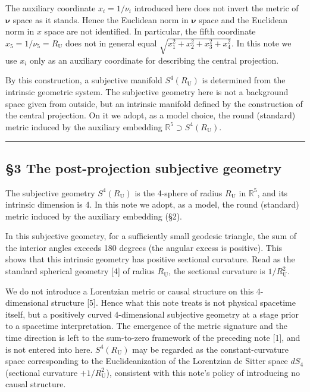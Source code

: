 \documentclass[
]{article}
\begin{document}
The auxiliary coordinate \(x_i=1/\nu_i\) introduced here does not invert
the metric of \(\boldsymbol{\nu}\) space as it stands. Hence the
Euclidean norm in \(\boldsymbol{\nu}\) space and the Euclidean norm in
\(x\) space are not identified. In particular, the fifth coordinate
\(x_5=1/\nu_5=R_{\mathrm U}\) does not in general equal
\(\sqrt{x_1^2+x_2^2+x_3^2+x_4^2}\). In this note we use \(x_i\) only as
an auxiliary coordinate for describing the central projection.

By this construction, a subjective manifold \(S^4(R_{\mathrm U})\) is
determined from the intrinsic geometric system. The subjective geometry
here is not a background space given from outside, but an intrinsic
manifold defined by the construction of the central projection. On it we
adopt, as a model choice, the round (standard) metric induced by the
auxiliary embedding \(\mathbb{R}^5\supset S^4(R_{\mathrm U})\).

\begin{center}\rule{0.5\linewidth}{0.5pt}\end{center}

\subsection{§3 The post-projection subjective
geometry}\label{the-post-projection-subjective-geometry}

The subjective geometry \(S^4(R_{\mathrm U})\) is the 4-sphere of radius
\(R_{\mathrm U}\) in \(\mathbb{R}^5\), and its intrinsic dimension is 4.
In this note we adopt, as a model, the round (standard) metric induced
by the auxiliary embedding (§2).

In this subjective geometry, for a sufficiently small geodesic triangle,
the sum of the interior angles exceeds 180 degrees (the angular excess
is positive). This shows that this intrinsic geometry has positive
sectional curvature. Read as the standard spherical geometry {[}4{]} of
radius \(R_{\mathrm U}\), the sectional curvature is
\(1/R_{\mathrm U}^2\).

We do not introduce a Lorentzian metric or causal structure on this
4-dimensional structure {[}5{]}. Hence what this note treats is not
physical spacetime itself, but a positively curved 4-dimensional
subjective geometry at a stage prior to a spacetime interpretation. The
emergence of the metric signature and the time direction is left to the
sum-to-zero framework of the preceding note {[}1{]}, and is not entered
into here. \(S^4(R_{\mathrm U})\) may be regarded as the
constant-curvature space corresponding to the Euclideanization of the
Lorentzian de Sitter space \(dS_4\) (sectional curvature
\(+1/R_{\mathrm U}^2\)), consistent with this note's policy of
introducing no causal structure.
\end{document}
